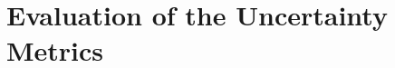 \section{Evaluation of the Uncertainty Metrics}
\label{ch:evaluation:sec:evaluation_metrics}








